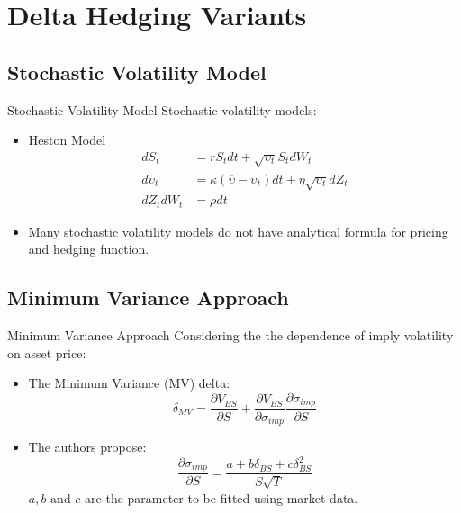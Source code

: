 \documentclass[10pt,table,mathserif]{beamer}
\begin{document}
\section{Delta Hedging Variants}
\subsection{Stochastic Volatility Model}
\begin{frame}{Stochastic Volatility Model}
Stochastic volatility models:
\begin{itemize}
  \item Heston Model
\[
\begin{split}
dS_t&=r S_t dt + \sqrt{\upsilon_t} S_t dW_t\\
d\upsilon_t&=\kappa(\overline{\upsilon}-\upsilon_t)dt+\eta \sqrt{\upsilon_t}dZ_t\\
dZ_tdW_t&=\rho dt
\end{split}
\]
\item Many stochastic volatility models do not have analytical formula for pricing and hedging function.
\end{itemize}
\end{frame}



\subsection{Minimum Variance Approach}
\begin{frame}{Minimum Variance Approach}
Considering the  the dependence of imply volatility on asset price:
\begin{itemize}
\item The  Minimum Variance (MV) delta:
\[
\delta_{MV}=\frac{\partial V_{BS}}{\partial S}+\frac{\partial V_{BS}}{\partial \sigma_{imp}}\frac{\partial \sigma_{imp}}{ \partial S}
\]
\item The authors \footnotemark propose:
\begin{equation}
\frac{\partial \sigma_{imp}}{ \partial S}=\frac{a+b\delta_{BS}+c \delta_{BS}^2}{S\sqrt{T}}
\end{equation}
$a, b \text{ and  } c$ are the parameter to be fitted using market data.
\end{itemize}
\end{frame}
\end{document}
